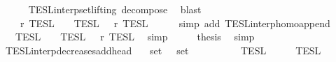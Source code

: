 \begin{isabellebody}
\ \ \ \ \isamarkupfalse%
\ TESL{\isacharunderscore}interp{\isacharunderscore}set{\isacharunderscore}lifting\ decompose\ \isamarkupfalse%
\ blast\isanewline
\ \ \isamarkupfalse%
\ \isamarkupfalse%
\ {\isacartoucheopen}{\isasymlbrakk}{\isasymlbrakk}\ {\isasymPhi}\ {\isacharat}\ {\isasymPhi}\isactrlsub r\ {\isasymrbrakk}{\isasymrbrakk}\isactrlsub T\isactrlsub E\isactrlsub S\isactrlsub L\ {\isacharequal}\ {\isasymlbrakk}{\isasymlbrakk}\ {\isasymPhi}\ {\isasymrbrakk}{\isasymrbrakk}\isactrlsub T\isactrlsub E\isactrlsub S\isactrlsub L\ {\isasyminter}\ {\isasymlbrakk}{\isasymlbrakk}\ {\isasymPhi}\isactrlsub r\ {\isasymrbrakk}{\isasymrbrakk}\isactrlsub T\isactrlsub E\isactrlsub S\isactrlsub L{\isacartoucheclose}\isanewline
\ \ \ \ \isamarkupfalse%
\ {\isacharparenleft}simp\ add{\isacharcolon}\ TESL{\isacharunderscore}interp{\isacharunderscore}homo{\isacharunderscore}append{\isacharparenright}\isanewline
\ \ \isamarkupfalse%
\ \isamarkupfalse%
\ {\isacartoucheopen}{\isasymlbrakk}{\isasymlbrakk}\ {\isasymPhi}\ {\isasymrbrakk}{\isasymrbrakk}\isactrlsub T\isactrlsub E\isactrlsub S\isactrlsub L\ {\isasymsupseteq}\ {\isasymlbrakk}{\isasymlbrakk}\ {\isasymPhi}\ {\isasymrbrakk}{\isasymrbrakk}\isactrlsub T\isactrlsub E\isactrlsub S\isactrlsub L\ {\isasyminter}\ {\isasymlbrakk}{\isasymlbrakk}\ {\isasymPhi}\isactrlsub r\ {\isasymrbrakk}{\isasymrbrakk}\isactrlsub T\isactrlsub E\isactrlsub S\isactrlsub L{\isacartoucheclose}\ \isamarkupfalse%
\ simp\isanewline
\ \ \isamarkupfalse%
\ \isamarkupfalse%
\ {\isacharquery}thesis\ \isamarkupfalse%
\ simp\isanewline
{}\isamarkupfalse%
%
\endisatagproof
{\isafoldproof}%
%
\isadelimproof
\isanewline
%
\endisadelimproof
\isanewline
{}\isamarkupfalse%
\ TESL{\isacharunderscore}interp{\isacharunderscore}decreases{\isacharunderscore}add{\isacharunderscore}head{\isacharcolon}\isanewline
\ \ \ {\isacartoucheopen}set\ {\isasymPhi}\ {\isasymsubseteq}\ set\ {\isasymPhi}{\isacharprime}{\isacartoucheclose}\isanewline
\ \ \ \ \ {\isacartoucheopen}{\isasymlbrakk}{\isasymlbrakk}\ {\isasymphi}\ {\isacharhash}\ {\isasymPhi}\ {\isasymrbrakk}{\isasymrbrakk}\isactrlsub T\isactrlsub E\isactrlsub S\isactrlsub L\ {\isasymsupseteq}\ {\isasymlbrakk}{\isasymlbrakk}\ {\isasymphi}\ {\isacharhash}\ {\isasymPhi}{\isacharprime}\ {\isasymrbrakk}{\isasymrbrakk}\isactrlsub T\isactrlsub E\isactrlsub S\isactrlsub L{\isacartoucheclose}\isanewline

\end{isabellebody}

